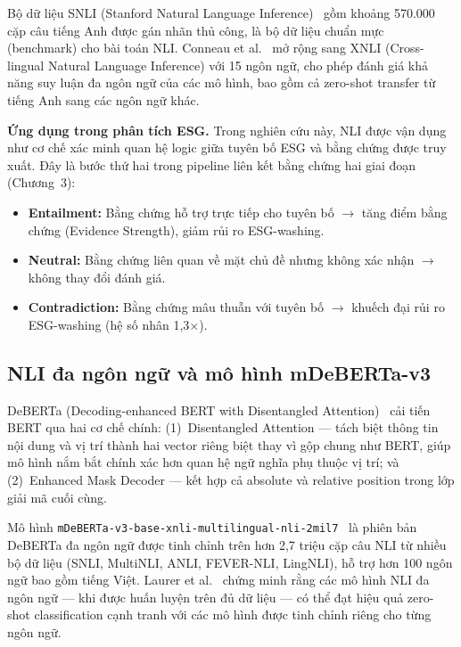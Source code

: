 Bộ dữ liệu SNLI (Stanford Natural Language Inference)~\cite{bowman2015large} gồm khoảng 570.000 cặp câu tiếng Anh được gán nhãn thủ công, là bộ dữ liệu chuẩn mực (benchmark) cho bài toán NLI. Conneau et al.~\cite{conneau2018xnli} mở rộng sang XNLI (Cross-lingual Natural Language Inference) với 15 ngôn ngữ, cho phép đánh giá khả năng suy luận đa ngôn ngữ của các mô hình, bao gồm cả zero-shot transfer từ tiếng Anh sang các ngôn ngữ khác.

\textbf{Ứng dụng trong phân tích ESG.} Trong nghiên cứu này, NLI được vận dụng như cơ chế xác minh quan hệ logic giữa tuyên bố ESG và bằng chứng được truy xuất. Đây là bước thứ hai trong pipeline liên kết bằng chứng hai giai đoạn (Chương~3):
\begin{itemize}
    \item \textbf{Entailment:} Bằng chứng hỗ trợ trực tiếp cho tuyên bố $\rightarrow$ tăng điểm bằng chứng (Evidence Strength), giảm rủi ro ESG-washing.
    \item \textbf{Neutral:} Bằng chứng liên quan về mặt chủ đề nhưng không xác nhận $\rightarrow$ không thay đổi đánh giá.
    \item \textbf{Contradiction:} Bằng chứng mâu thuẫn với tuyên bố $\rightarrow$ khuếch đại rủi ro ESG-washing (hệ số nhân 1,3$\times$).
\end{itemize}


\subsection{NLI đa ngôn ngữ và mô hình mDeBERTa-v3}
\label{subsec:deberta}

DeBERTa (Decoding-enhanced BERT with Disentangled Attention)~\cite{he2020deberta} cải tiến BERT qua hai cơ chế chính: (1)~Disentangled Attention --- tách biệt thông tin nội dung và vị trí thành hai vector riêng biệt thay vì gộp chung như BERT, giúp mô hình nắm bắt chính xác hơn quan hệ ngữ nghĩa phụ thuộc vị trí; và (2)~Enhanced Mask Decoder --- kết hợp cả absolute và relative position trong lớp giải mã cuối cùng.

Mô hình \texttt{mDeBERTa-v3-base-xnli-multilingual-nli-2mil7}~\cite{laurer2023building} là phiên bản DeBERTa đa ngôn ngữ được tinh chỉnh trên hơn 2,7 triệu cặp câu NLI từ nhiều bộ dữ liệu (SNLI, MultiNLI, ANLI, FEVER-NLI, LingNLI), hỗ trợ hơn 100 ngôn ngữ bao gồm tiếng Việt. Laurer et al.~\cite{laurer2023building} chứng minh rằng các mô hình NLI đa ngôn ngữ --- khi được huấn luyện trên đủ dữ liệu --- có thể đạt hiệu quả zero-shot classification cạnh tranh với các mô hình được tinh chỉnh riêng cho từng ngôn ngữ.

